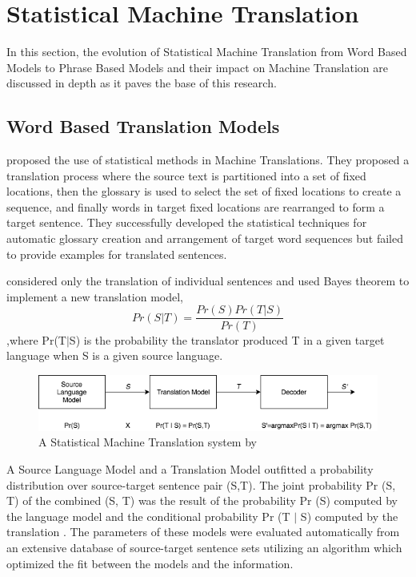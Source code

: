 \section{Statistical Machine Translation}

In this section, the evolution of Statistical Machine Translation from Word Based Models to Phrase Based Models and their impact on Machine Translation are discussed in depth as it paves the base of this research.

\subsection{Word Based Translation Models}
\cite{Brown:1988:SAL:991635.991651} proposed the use of statistical methods in Machine Translations. They proposed a translation process where the source text is partitioned into a set of fixed locations, then the glossary is used  to select the set of fixed locations to create a sequence, and finally words in target fixed locations are rearranged to form a target sentence. They successfully developed the statistical techniques for automatic glossary creation and arrangement of target word sequences but failed to provide examples for translated sentences.

\cite{Brown:1990:SAM:92858.92860}   considered only the translation of individual
sentences and used Bayes theorem to implement a new translation model, 
\begin{equation*}
    Pr(S|T)= \frac{Pr (S) Pr (T|S) }{Pr (T) }
\end{equation*}
,where Pr(T$|$S) is the probability the translator produced T in a given target language when  S is a given source language. 

\begin{figure}[h]
\includegraphics[width=\textwidth]{figures/wbmt.png}
\caption{
A Statistical Machine Translation system  by \cite{Brown:1990:SAM:92858.92860} } \label{wbmt}
\end{figure}

A Source Language Model and a Translation Model outfitted a probability distribution over source-target sentence pair (S,T). The joint probability Pr (S, T) of the combined (S, T) was the result of the probability Pr (S) computed by the language model and the conditional probability Pr (T $|$ S) computed by the translation . The parameters of these models were evaluated automatically from an extensive database of source-target sentence sets utilizing an algorithm which optimized the fit between the models and the information.

